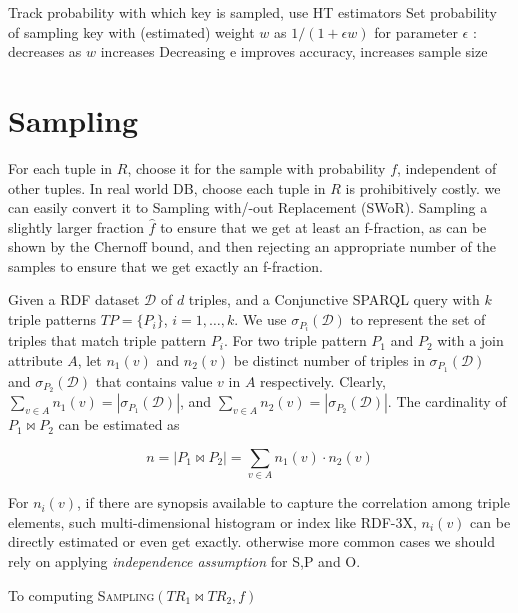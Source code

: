 \documentclass[runningheads]{llncs}
\begin{document}
Track probability with which key is sampled, use HT estimators
Set probability of sampling key with (estimated) weight $w$ as $1/(1 + \epsilon w)$ for parameter $\epsilon$ : decreases as $w$ increases
Decreasing e improves accuracy, increases sample size

%
%

\section{Sampling}

For each tuple in $R$, choose it for the sample with probability $f$, independent of other tuples. In real world DB, choose each tuple in $R$ is prohibitively costly. we can easily convert it to Sampling with/-out Replacement (SWoR). Sampling a slightly larger fraction $\hat{f}$ to ensure that we get at least an f-fraction, as can
be shown by the Chernoff bound, and then rejecting an appropriate number of the samples to ensure that we get exactly an f-fraction. 


Given a RDF dataset $\mathcal{D}$ of $d$ triples, and a Conjunctive SPARQL query with $k$ triple patterns  $TP=\{P_i\}$, $i=1,\ldots,k$. We use $\sigma_{P_{i}}(\mathcal{D})$ to represent the set of triples that match triple pattern $P_{i}$. For two triple pattern $P_{1}$ and $P_{2}$ with a join attribute $A$,  let $n_1(v)$ and $n_2(v)$ be distinct number of triples in $\sigma_{P_{1}}(\mathcal{D})$ and $\sigma_{P_{2}}(\mathcal{D})$ that contains value $v$ in  $A$ respectively. Clearly, $\sum_{v \in A} n_1(v) = |\sigma_{P_{1}}(\mathcal{D})|$, and $\sum_{v \in A} n_2(v) = |\sigma_{P_{2}}(\mathcal{D})|$. The cardinality of $P_{1} \bowtie P_{2}$ can be estimated as 

\begin{equation}
n = |P_{1} \bowtie P_{2}| = \sum\limits_{v \in A} n_1(v)\cdot n_2(v)
\end{equation}

For $n_i(v)$, if there are synopsis available to capture the correlation among triple elements, such multi-dimensional histogram or index like RDF-3X, $n_i(v)$ can be directly estimated or even get exactly. otherwise more common cases we should rely on applying \textit{independence assumption} for S,P and O. 

To computing \textsc{Sampling}$(TR_{1} \bowtie TR_{2}, f)$


%
%
%
%
% 
% 
%

\begin{thebibliography}{8}


\end{thebibliography}
\end{document}
